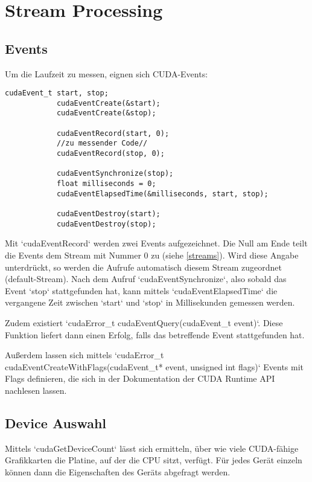 		\section{Stream Processing}
		\subsection{Events}
        Um die Laufzeit zu messen, eignen sich CUDA-Events:		
		\begin{lstlisting}[caption=~Events]
			cudaEvent_t start, stop;
			cudaEventCreate(&start);
			cudaEventCreate(&stop);

			cudaEventRecord(start, 0);
			//zu messender Code//
			cudaEventRecord(stop, 0);	
		
			cudaEventSynchronize(stop);
			float milliseconds = 0;
			cudaEventElapsedTime(&milliseconds, start, stop);
		
			cudaEventDestroy(start);
			cudaEventDestroy(stop);
		\end{lstlisting}

		Mit \li`cudaEventRecord` werden zwei Events aufgezeichnet. Die Null am Ende teilt die Events dem Stream mit Nummer 0 zu (siehe \ref{streams}). Wird diese Angabe unterdrückt, so werden die Aufrufe automatisch diesem \Gls{Stream} zugeordnet (default-\Gls{Stream}). Nach dem Aufruf \li`cudaEventSynchronize`, also sobald das Event \li`stop` stattgefunden hat, kann mittels \li`cudaEventElapsedTime` die vergangene Zeit zwischen \li`start` und \li`stop` in Millisekunden gemessen werden.
		
		Zudem existiert \li`cudaError_t cudaEventQuery(cudaEvent_t event)`. Diese Funktion liefert dann einen Erfolg, falls das betreffende Event stattgefunden hat.
		
		Außerdem lassen sich mittels \li`cudaError_t cudaEventCreateWithFlags(cudaEvent_t* event, unsigned int flags)` Events mit Flags definieren, die sich in der Dokumentation der CUDA Runtime \Gls{API} nachlesen lassen. \autocite{cudaRTAPI}
		
      
		\subsection{Device Auswahl}
		Mittels \li`cudaGetDeviceCount` lässt sich ermitteln, über wie viele CUDA-fähige Grafikkarten die Platine, auf der die CPU sitzt, verfügt. Für jedes Gerät einzeln können dann die Eigenschaften des Geräts abgefragt werden.
		
